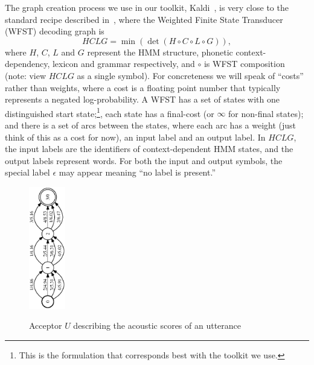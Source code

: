 \documentclass{article}
\def\HCLG{{\mathit{HCLG}}}
\begin{document}
The graph creation process we use in our toolkit, Kaldi~\cite{kaldi_paper},
is very close to the standard recipe described in~\cite{wfst},
where the Weighted Finite State Transducer (WFST) decoding graph is
\begin{equation}
  \HCLG = \min(\det(H \circ C \circ L \circ G)),
\end{equation}
where $H$, $C$, $L$ and $G$ represent the HMM structure, phonetic
context-dependency, lexicon and grammar respectively, 
and $\circ$ is WFST composition (note: view $\HCLG$ as a single symbol).
For concreteness we will speak of ``costs'' rather
than weights, where a cost is a floating point number that typically represents a negated
log-probability.  A WFST has a set of states with one distinguished
start state;\footnote{This is the formulation that corresponds best with the toolkit we use.},
each state has a final-cost (or $\infty$ for non-final states);
and there is a set of arcs between the states, where each arc has a weight
(just think of this as a cost for now), an input label and an output
label.  In $\HCLG$, the input labels are the identifiers of context-dependent
HMM states, and the output labels represent words.  For both the input and output
symbols, the special label $\epsilon$ may appear meaning ``no label is present.''


\begin{figure}
\begin{center}
\includegraphics[height=2.1in,angle=270]{figures/acceptor_utterance.eps}
\vspace*{-0.03in}
  \caption{Acceptor $U$ describing the acoustic scores of an utterance}
\vspace*{-0.15in}
\label{fig:acceptor}
\end{center}

\end{figure}
\end{document}
